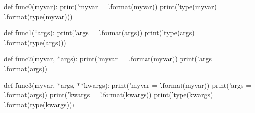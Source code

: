 \documentclass[multi, border=4]{standalone}
\begin{document}
\begin{pythoncode}
def func0(myvar):
    print('myvar = {}'.format(myvar))
    print('type(myvar) = {}'.format(type(myvar)))

def func1(*args):
    print('args = {}'.format(args))
    print('type(args) = {}'.format(type(args)))

def func2(myvar, *args):
    print('myvar = {}'.format(myvar))
    print('args = {}'.format(args))

def func3(myvar, *args, **kwargs):
    print('myvar = {}'.format(myvar))
    print('args = {}'.format(args))
    print('kwargs = {}'.format(kwargs))
    print('type(kwargs) = {}'.format(type(kwargs)))
\end{pythoncode}
\end{document}
